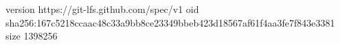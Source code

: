 version https://git-lfs.github.com/spec/v1
oid sha256:167c5218ccaac48c33a9bb8ce23349bbeb423d18567af61f4aa3fe7f843e3381
size 1398256
